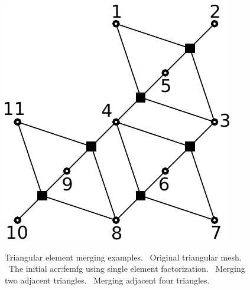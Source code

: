\begin{figure}[h]
{{	\includegraphics[scale=\MyVariableScale]{fg_triangle_merge_c} \label{fig:elm_merge_c}
	}
	\hspace{\MyVariableSeparation}
	}
	\caption[Element merging examples.]{Triangular element merging examples. \protect{}~Original triangular mesh. \protect{}~The initial \gls{acr:femfg} using single element factorization. \protect{}~Merging two adjacent triangles. \protect{}~Merging adjacent four triangles.}
	\label{fig:elm_merge}
\end{figure}


